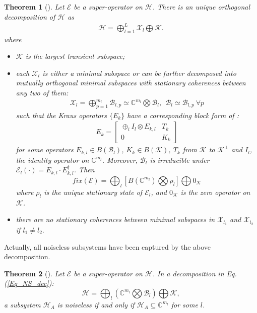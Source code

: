 \documentclass[journal]{IEEEtran}
\def\h{\ensuremath{\mathcal{H}}}
\def\k{\ensuremath{\mathcal{K}}}
\def\x{\ensuremath{\mathcal{X}}}
\def\b{\ensuremath{\mathcal{B}}}
\def\e{\ensuremath{\mathcal{E}}}
\def\k{\mathcal{K}}
\newtheorem{theorem}{Theorem}
\begin{document}
\begin{theorem}[\cite{baumgartner2012structure}]\label{Theo_NS_Dec}
  Let $\e$ be a super-operator on $\h$. There is an unique  orthogonal decomposition of $\h$ as
  \begin{eqnarray}\label{Eq_NS_dec_unique}
    \h=\bigoplus_{l=1}^{L}\x_l\bigoplus \k.
  \end{eqnarray}
  where \begin{itemize}
    \item[(1)] $\k$ is the largest transient subspace;
    \item[(2)] each $\x_l$ is either a minimal subspace or can be further decomposed into mutually orthogonal minimal subspaces with stationary coherences between any two of them:
    \begin{eqnarray}\label{Eq_NS_dec}
      \x_l=\bigoplus_{p=1}^{m_l}\b_{l,p}\simeq\mathbb{C}^{m_l}\bigotimes \b_l, \ \ \b_l\simeq \b_{l,p}\ \forall p
    \end{eqnarray} 
    such that the Kraus operators $\{E_k\}$ have a corresponding block form of :
  \begin{eqnarray}\label{Eq_SC_dec_Kraus}
    E_k=\left[\begin{matrix}
  \oplus_l I_{l}\otimes E_{k,l} & T_k\\
0&K_k
\end{matrix}\right]
  \end{eqnarray}
for some operators $E_{k,l}\in B(\b_l)$, $K_k\in B(\k)$, $T_k$ from $\k$ to $\k^\perp$ and $I_{l}$, the identity operator on $\mathbb{C}^{m_l}$. Moreover, $\b_l$ is irreducible under $\e_{l}(\cdot)=E_{k,l}\cdot E_{k,l}^\dagger$. Then 
    $$fix(\e)=\bigoplus_{l}[B(\mathbb{C}^{m_l})\bigotimes \rho_{l}]\bigoplus 0_\k $$
    where $\rho_l$ is the unique stationary state of $\e_{l}$, and $0_\k$ is the zero operator on $\k$.
    \item[(3)] there are no stationary coherences between minimal subspaces in $\x_{l_1}$ and $\x_{l_2}$ if $l_{1}\not =l_2.$
      \end{itemize}
\end{theorem}

Actually, all noiseless subsystems have been captured by the above decomposition.
\begin{theorem}[\cite{blume2010information}]
  Let $\e$ be a super-operator on $\h$. In a decomposition in Eq.(\ref{Eq_NS_dec}):
   $$\h=\bigoplus_{l}(\mathbb{C}^{m_l}\bigotimes\b_l)\bigoplus\k,$$ a subsystem $\h_A$ is noiseless if and only if $\h_A\subseteq \mathbb{C}^{m_l}$ for some $l$.
\end{theorem}
\end{document}
